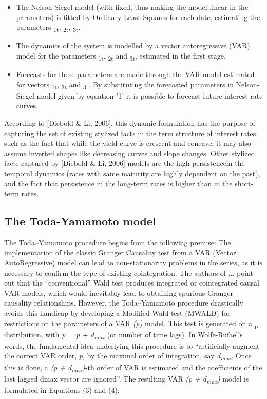 \documentclass{article}
\begin{document}
\begin{itemize}
\item The Nelson-Siegel model (with \texttau fixed, thus making the model linear in the parameters) is fitted by Ordinary Least Squares for each date, estimating the parameters \textbeta\textsubscript{1t}, \textbeta\textsubscript{2t}, \textbeta\textsubscript{3t}.
\item The dynamics of the system is modelled by a vector autoregressive (VAR) model for the parameters \textbeta\textsubscript{1t}, \textbeta\textsubscript{2t} and \textbeta\textsubscript{3t}, estimated in the first stage. 
\item Forecasts for these parameters are made through the VAR model estimated for vectors \textbeta\textsubscript{1t}, \textbeta\textsubscript{2t} and \textbeta\textsubscript{3t}. By substituting the forecasted parameters in Nelson-Siegel model given by equation '1' it is possible to forecast future interest rate curves. %
\end{itemize}

According to [Diebold \& Li, 2006], this dynamic formulation has the purpose of capturing the set of existing stylized facts in the term structure of interest rates, such as the fact that while the yield curve is crescent and concave, it may also assume inverted shapes like decreasing curves and slope changes. Other stylized facts captured by [Diebold \& Li, 2006] models are the high persistencein the temporal dynamics (rates with same maturity are highly dependent on the past), and the fact that persistence in the long-term rates is higher than in the short-term rates.

\subsection{The Toda-Yamamoto model}

The Toda–Yamamoto procedure begins from the following premise: The implementation
of the classic Granger Causality test from a VAR (Vector AutoRegressive) model can lead to non-stationarity problems in the series, as it is necessary to confirm the type of existing
cointegration. The authors of ... point out that the “conventional” Wald test produces
integrated or cointegrated causal VAR models, which would inevitably lead to obtaining spurious
Granger causality relationships. However, the Toda–Yamamoto procedure drastically avoids
this handicap by developing a Modified Wald test (MWALD) for restrictions on the parameters
of a VAR \textit{(p)} model. This test is generated on a \textchi\textsubscript{p}  distribution, with \textit{p = p + d\textsubscript{max}} (or number of
time lags). In Wolfe-Rufael’s words, the fundamental idea underlying this procedure is to
“artificially augment the correct VAR order, \textit{p}, by the maximal order of integration, say \textit{d\textsubscript{max}}. Once this
is done, a \textit{(p + d\textsubscript{max})}-th order of VAR is estimated and the coefficients of the last lagged dmax vector are
ignored”. The resulting VAR  \textit{(p + d\textsubscript{max})} model is formulated in Equations (3) and (4):
\end{document}
